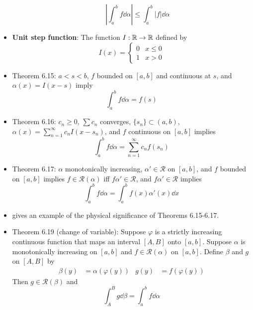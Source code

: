 \documentclass[../../notes.tex]{subfiles}
\begin{document}
\begin{itemize}
\begin{enumerate}[label={(\alph*)}]
\begin{equation*}
            \left| \int_a^bf\dd{\alpha} \right| \leq \int_a^b|f|\dd{\alpha}
        \end{equation*}
    \end{enumerate}
    \item \textbf{Unit step function}: The function $I:\mathbb{R}\to\mathbb{R}$ defined by
    \begin{equation*}
        I(x) =
        \begin{cases}
            0 & x\leq 0\\
            1 & x>0
        \end{cases}
    \end{equation*}
    \item Theorem 6.15: $a<s<b$, $f$ bounded on $[a,b]$ and continuous at $s$, and $\alpha(x)=I(x-s)$ imply
    \begin{equation*}
        \int_a^bf\dd{\alpha} = f(s)
    \end{equation*}
    \item Theorem 6.16: $c_n\geq 0$, $\sum c_n$ converges, $\{s_n\}\subset(a,b)$, $\alpha(x)=\sum_{n=1}^\infty c_nI(x-s_n)$, and $f$ continuous on $[a,b]$ implies
    \begin{equation*}
        \int_a^bf\dd{\alpha} = \sum_{n=1}^\infty c_nf(s_n)
    \end{equation*}
    \item Theorem 6.17: $\alpha$ monotonically increasing, $\alpha'\in\mathscr{R}$ on $[a,b]$, and $f$ bounded on $[a,b]$ implies $f\in\mathscr{R}(\alpha)$ iff $f\alpha'\in\mathscr{R}$, and $f\alpha'\in\mathscr{R}$ implies
    \begin{equation*}
        \int_a^bf\dd{\alpha} = \int_a^bf(x)\alpha'(x)\dd{x}
    \end{equation*}
    \item \textcite{bib:Rudin} gives an example of the physical significance of Theorems 6.15-6.17.
    \item Theorem 6.19 (change of variable): Suppose $\varphi$ is a strictly increasing continuous function that maps an interval $[A,B]$ onto $[a,b]$. Suppose $\alpha$ is monotonically increasing on $[a,b]$ and $f\in\mathscr{R}(\alpha)$ on $[a,b]$. Define $\beta$ and $g$ on $[A,B]$ by
    \begin{align*}
        \beta(y) &= \alpha(\varphi(y))&
        g(y) &= f(\varphi(y))
    \end{align*}
    Then $g\in\mathscr{R}(\beta)$ and
    \begin{equation*}
        \int_A^Bg\dd{\beta} = \int_a^bf\dd{\alpha}
    \end{equation*}

\end{itemize}
\end{document}
